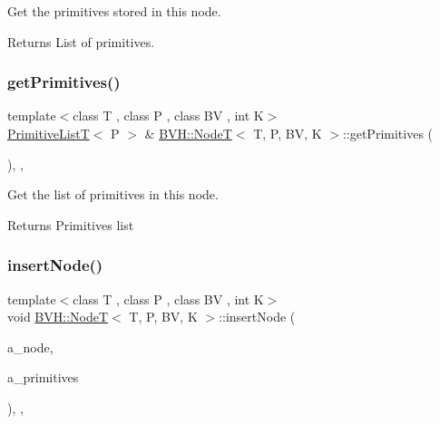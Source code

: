 Get the primitives stored in this node. 

\begin{DoxyReturn}{Returns}
List of primitives. 
\end{DoxyReturn}
\mbox{\label{classBVH_1_1NodeT_adce9d9c6bd4ab3d613bef232353774f3}} 
\subsubsection{\texorpdfstring{get\+Primitives()}{getPrimitives()}\hspace{0.1cm}{\footnotesize\ttfamily [2/2]}}
{\footnotesize\ttfamily template$<$class T , class P , class BV , int K$>$ \\
\hyperlink{namespaceBVH_aa1e753bda451b85cd5b948722a2ad7c7}{Primitive\+ListT}$<$ P $>$ \& \hyperlink{classBVH_1_1NodeT}{B\+V\+H\+::\+NodeT}$<$ T, P, BV, K $>$\+::get\+Primitives (\begin{DoxyParamCaption}{ }\end{DoxyParamCaption})\hspace{0.3cm}{\ttfamily [inline]}, {\ttfamily [protected]}, {\ttfamily [noexcept]}}



Get the list of primitives in this node. 

\begin{DoxyReturn}{Returns}
Primitives list 
\end{DoxyReturn}
\mbox{\label{classBVH_1_1NodeT_a8113c8dfa5ab6dc3cf931c5c8fdd6ddb}} 
\subsubsection{\texorpdfstring{insert\+Node()}{insertNode()}}
{\footnotesize\ttfamily template$<$class T , class P , class BV , int K$>$ \\
void \hyperlink{classBVH_1_1NodeT}{B\+V\+H\+::\+NodeT}$<$ T, P, BV, K $>$\+::insert\+Node (\begin{DoxyParamCaption}\item[{\hyperlink{classBVH_1_1NodeT_a008f5c2c53adb1f5730d8478b48529b1}{Node\+Ptr} \&}]{a\+\_\+node,  }\item[{const \hyperlink{classBVH_1_1NodeT_a19cce6e7fbe85eccb4a3718dd69f49b7}{Primitive\+List} \&}]{a\+\_\+primitives }\end{DoxyParamCaption})\hspace{0.3cm}{\ttfamily [inline]}, {\ttfamily [protected]}, {\ttfamily [noexcept]}}



